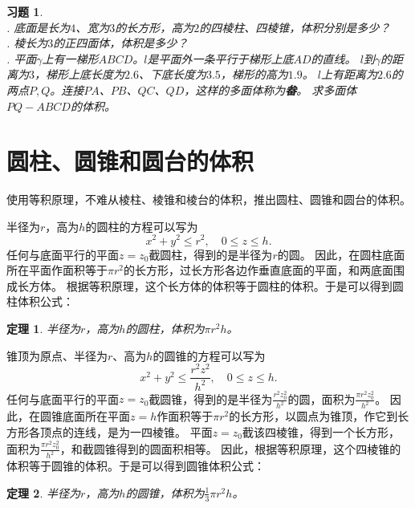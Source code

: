 \documentclass[12pt,UTF8]{ctexbook}
\newtheorem{tm}{定理}[section]
\newtheorem{xt}{习题}[section]
\begin{document}
\begin{xt}
    \mbox{}\\
    . 底面是长为$4$、宽为$3$的长方形，高为$2$的四棱柱、四棱锥，体积分别是多少？\\
    . 棱长为$3$的正四面体，体积是多少？\\
    . 平面$\gamma$上有一梯形$ABCD$。$l$是平面外一条平行于梯形上底$AD$的直线。
    $l$到$\gamma$的距离为$3$，梯形上底长度为$2.6$、下底长度为$3.5$，梯形的高为$1.9$。
    $l$上有距离为$2.6$的两点$P,Q$。连接$PA$、$PB$、$QC$、$QD$，这样的多面体称为\textbf{畚}。
    求多面体$PQ-ABCD$的体积。
\end{xt}

\section{圆柱、圆锥和圆台的体积}
使用等积原理，不难从棱柱、棱锥和棱台的体积，推出圆柱、圆锥和圆台的体积。

半径为$r$，高为$h$的圆柱的方程可以写为
$$ x^2 + y^2 \leqslant r^2 , \quad 0\leqslant z \leqslant h.$$
任何与底面平行的平面$z=z_0$截圆柱，得到的是半径为$r$的圆。
因此，在圆柱底面所在平面作面积等于$\pi r^2$的长方形，过长方形各边作垂直底面的平面，和两底面围成长方体。
根据等积原理，这个长方体的体积等于圆柱的体积。于是可以得到圆柱体积公式：
\begin{tm}\label{tm:3-3-0}
    半径为$r$，高为$h$的圆柱，体积为$\pi r^2h$。
\end{tm}

锥顶为原点、半径为$r$、高为$h$的圆锥的方程可以写为
$$ x^2 + y^2 \leqslant \frac{r^2z^2}{h^2} , \quad 0\leqslant z \leqslant h.$$
任何与底面平行的平面$z=z_0$截圆锥，得到的是半径为$\frac{r^2z_0^2}{h^2}$的圆，面积为$\frac{\pi r^2z_0^2}{h^2}$。
因此，在圆锥底面所在平面$z=h$作面积等于$\pi r^2$的长方形，以圆点为锥顶，作它到长方形各顶点的连线，是为一四棱锥。
平面$z=z_0$截该四棱锥，得到一个长方形，面积为$\frac{\pi r^2z_0^2}{h^2}$，和截圆锥得到的圆面积相等。
因此，根据等积原理，这个四棱锥的体积等于圆锥的体积。于是可以得到圆锥体积公式：
\begin{tm}\label{tm:3-3-10}
    半径为$r$，高为$h$的圆锥，体积为$\frac{1}{3}\pi r^2h$。
\end{tm}
\end{document}

